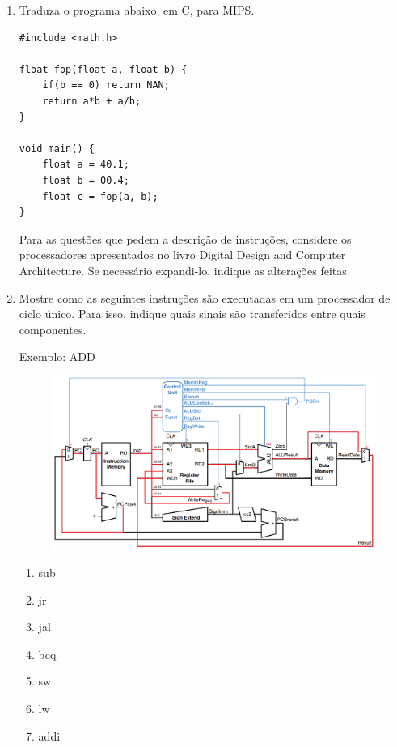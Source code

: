 \documentclass{article}
\begin{document}
\begin{enumerate}
\pagebreak

\item Traduza o programa abaixo, em C, para MIPS.

\begin{center}
    \begin{minipage}{0.475\textwidth}
        \begin{lstlisting}[frame=single]
#include <math.h>

float fop(float a, float b) {
    if(b == 0) return NAN;
    return a*b + a/b;
}

void main() {
    float a = 40.1;
    float b = 00.4;
    float c = fop(a, b);
}
        \end{lstlisting}
    \end{minipage}
\end{center}

Para as questões que pedem a descrição de instruções, considere os processadores apresentados no livro Digital Design and Computer Architecture. Se necessário expandi-lo, indique as alterações feitas.

\item Mostre como as seguintes instruções são executadas em um processador de ciclo único. Para isso, indique quais sinais são transferidos entre quais componentes.

Exemplo: ADD\\

\begin{figure}[H]
    \centering
    \includegraphics[width=1\linewidth]{add.png}
\end{figure}

\begin{enumerate}
    \item sub
    \item jr
    \item jal
    \item beq
    \item sw
    \item lw
    \item addi
\end{enumerate}


\end{enumerate}
\end{document}
